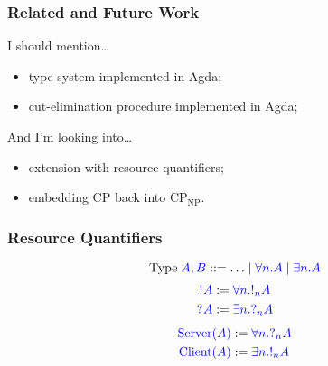 \documentclass[xcolor={dvipsnames}]{beamer}
\begin{document}
\begin{frame}
  \frametitle{Related and Future Work}
  I should mention\dots
  \begin{itemize}
  \item type system implemented in Agda;
  \item cut-elimination procedure implemented in Agda;
  \end{itemize}
  And I'm looking into\dots
  \begin{itemize}
  \item extension with resource quantifiers;
  \item embedding CP back into $\text{CP}_{\text{NP}}$.
  \end{itemize}
\end{frame}


\begin{frame}
  \frametitle{Resource Quantifiers}
  \[
    \text{Type} \; \tm{A},\tm{B} ::= \ldots \mid \tm{\forall{n}.A} \mid \tm{\exists{n}.A} 
  \]
  \vfill
  \[\!
    \begin{aligned}
      \tm{\take{A}} &:= \tm{\forall{n}.\take[n]{A}} \\ 
      \tm{\give{A}} &:= \tm{\exists{n}.\give[n]{A}}
    \end{aligned}
  \]
  \vfill
  \[\!
    \begin{aligned}
      \tm{\text{Server}(A)} &:= \tm{\forall{n}.\give[n]{A}} \\ 
      \tm{\text{Client}(A)} &:= \tm{\exists{n}.\take[n]{A}}
    \end{aligned}
  \]
\end{frame}
\end{document}
